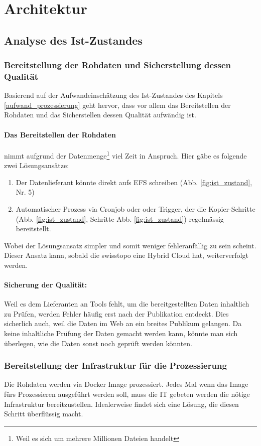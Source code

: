 \section{Architektur}

\subsection{Analyse des Ist-Zustandes}
\subsubsection{Bereitstellung der Rohdaten und Sicherstellung dessen Qualität}
Basierend auf der Aufwandeinschätzung des Ist-Zustandes des Kapitels \ref{aufwand_prozessierung} geht hervor, dass vor allem das Bereitstellen der Rohdaten und das Sicherstellen dessen Qualität aufwändig ist. 

\paragraph{Das Bereitstellen der Rohdaten} nimmt aufgrund der Datenmenge\footnote{Weil es sich um mehrere Millionen Dateien handelt} viel Zeit in Anspruch. Hier gäbe es folgende zwei Lösungsansätze:
\begin{enumerate}
\item Der Datenlieferant könnte direkt aufs EFS schreiben (Abb. \ref{fig:ist_zustand}, Nr. 5)
\item Automatischer Prozess via Cronjob oder oder Trigger, der die Kopier-Schritte (Abb. \ref{fig:ist_zustand}, Schritte Abb. \ref{fig:ist_zustand}) regelmässig bereitstellt.
\end{enumerate}

Wobei der Lösungsansatz simpler und somit weniger fehleranfällig zu sein scheint. Dieser Ansatz kann, sobald die swisstopo eine Hybrid Cloud hat, weiterverfolgt werden.

\paragraph{Sicherung der Qualität:} Weil es dem Lieferanten an Tools fehlt, um die bereitgestellten Daten inhaltlich zu Prüfen, werden Fehler 
häufig erst nach der Publikation entdeckt. Dies sicherlich auch, weil die Daten im Web an ein breites Publikum gelangen. Da keine inhaltliche Prüfung der Daten gemacht werden kann, könnte man sich überlegen, wie die Daten sonst noch geprüft werden könnten.

\subsubsection{Bereitstellung der Infrastruktur für die Prozessierung}
Die Rohdaten werden via Docker Image prozessiert. Jedes Mal wenn das Image fürs Prozessieren ausgeführt werden soll, muss die IT gebeten werden die nötige Infrastruktur bereitzustellen. Idealerweise findet sich eine Lösung, die diesen Schritt überflüssig macht.


